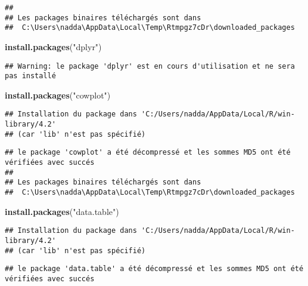 \documentclass[
]{article}
\newenvironment{Shaded}{\begin{snugshade}}{\end{snugshade}}
\newcommand{\FunctionTok}[1]{\textcolor[rgb]{0.13,0.29,0.53}{\textbf{#1}}}
\newcommand{\NormalTok}[1]{#1}
\newcommand{\StringTok}[1]{\textcolor[rgb]{0.31,0.60,0.02}{#1}}
\begin{document}
\begin{verbatim}
## 
## Les packages binaires téléchargés sont dans
##  C:\Users\nadda\AppData\Local\Temp\Rtmpgz7cDr\downloaded_packages
\end{verbatim}

\begin{Shaded}
\begin{Highlighting}[]
\FunctionTok{install.packages}\NormalTok{(}\StringTok{"dplyr"}\NormalTok{)}
\end{Highlighting}
\end{Shaded}

\begin{verbatim}
## Warning: le package 'dplyr' est en cours d'utilisation et ne sera pas installé
\end{verbatim}

\begin{Shaded}
\begin{Highlighting}[]
\FunctionTok{install.packages}\NormalTok{(}\StringTok{"cowplot"}\NormalTok{)}
\end{Highlighting}
\end{Shaded}

\begin{verbatim}
## Installation du package dans 'C:/Users/nadda/AppData/Local/R/win-library/4.2'
## (car 'lib' n'est pas spécifié)
\end{verbatim}

\begin{verbatim}
## le package 'cowplot' a été décompressé et les sommes MD5 ont été vérifiées avec succés
## 
## Les packages binaires téléchargés sont dans
##  C:\Users\nadda\AppData\Local\Temp\Rtmpgz7cDr\downloaded_packages
\end{verbatim}

\begin{Shaded}
\begin{Highlighting}[]
\FunctionTok{install.packages}\NormalTok{(}\StringTok{"data.table"}\NormalTok{)}
\end{Highlighting}
\end{Shaded}

\begin{verbatim}
## Installation du package dans 'C:/Users/nadda/AppData/Local/R/win-library/4.2'
## (car 'lib' n'est pas spécifié)
\end{verbatim}

\begin{verbatim}
## le package 'data.table' a été décompressé et les sommes MD5 ont été vérifiées avec succés
\end{verbatim}
\end{document}
